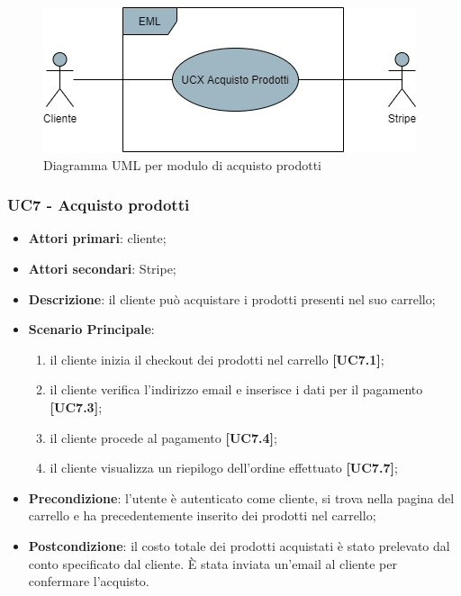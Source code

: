 \begin{figure}[H]
\centering
\includegraphics[scale=0.6]{res/UseCase/Immagini/AcquistoProdottiGenerale}
\caption{Diagramma UML per modulo di acquisto prodotti}
\end{figure}

\subsubsection{UC7 - Acquisto prodotti}
\begin{itemize}
\item \textbf{Attori primari}: cliente;
\item \textbf{Attori secondari}: Stripe;
\item \textbf{Descrizione}: il cliente può acquistare i prodotti presenti nel suo carrello;
\item \textbf{Scenario Principale}: 
\begin{enumerate}
	\item il cliente inizia il checkout dei prodotti nel carrello \textbf{[UC7.1]};
	\item il cliente verifica l'indirizzo email e inserisce i dati per il pagamento \textbf{[UC7.3]};
	\item il cliente procede al pagamento \textbf{[UC7.4]};
	\item il cliente visualizza un riepilogo dell'ordine effettuato \textbf{[UC7.7]};
\end{enumerate}
\item \textbf{Precondizione}: l'utente è autenticato come cliente, si trova nella pagina del carrello e ha precedentemente inserito dei prodotti nel carrello;
\item \textbf{Postcondizione}: il costo totale dei prodotti acquistati è stato prelevato dal conto specificato dal cliente. È stata inviata un'email al cliente per confermare l'acquisto.
\end{itemize}

